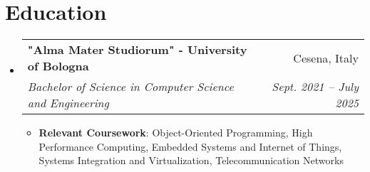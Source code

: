 \documentclass[letterpaper,11pt]{article}
\makeatletter
\newcommand{\resumeItem}[2]{
  \item\small{
    \textbf{#1}{: #2 \vspace{-2pt}}
  }
}
\newcommand{\resumeSubheading}[4]{
  \vspace{-1pt}\item
    \begin{tabular*}{0.97\textwidth}{l@{\extracolsep{\fill}}r}
      \textbf{#1} & #2 \\
      \textit{\small#3} & \textit{\small #4} \\
    \end{tabular*}\vspace{-5pt}
}
\newcommand{\resumeSubHeadingListStart}{\begin{itemize}[leftmargin=*]}
\newcommand{\resumeSubHeadingListEnd}{\end{itemize}}
\newcommand{\resumeItemListStart}{\begin{itemize}}
\newcommand{\resumeItemListEnd}{\end{itemize}\vspace{-5pt}}
\makeatother
\begin{document}
\begin{comment}    
    \resumeSubheading
      {UBM - Unibo Motorsport Team}{Bologna, Italy}
      {Software developer}{Oct. 2023 - Current}
      \resumeItemListStart
        \resumeItem{Python}
          {I improved the back-end of the application, implementing new features, 
            documenting the code and fixing bugs.
            In particular:}
            \resumeItemListStart
                \resumeItem{Connection pooling}
                    {I implemented a connection pool to the database, to avoid the overhead of creating a new connection every time a request is made.}
            \resumeItemListEnd
      \resumeItemListEnd

  
    \resumeSubheading
      {Other Company}{Location}
      {Position}{From - To}
      \resumeItemListStart
        \resumeItem{Technology you worked with/on}
          {Description}
        \resumeItem{Other technology you worked with/on}
          {Description}
      \resumeItemListEnd

    \resumeSubheading
      {Research Position}{Location}
      {Position}{From - To}
      \resumeItemListStart
        \resumeItem{Technology you worked with/on}
          {Description}
        \resumeItem{Other technology you worked with/on}
          {Description}
      \resumeItemListEnd
\end{comment}

\section{Education}
  \resumeSubHeadingListStart
    \resumeSubheading
      {"Alma Mater Studiorum" - University of Bologna}{Cesena, Italy}
      {Bachelor of Science in Computer Science and Engineering}{Sept. 2021 -- July 2025}
      \resumeItemListStart
          \resumeItem{Relevant Coursework}{Object-Oriented Programming, High Performance Computing, 
          Embedded Systems and Internet of Things, Systems Integration and Virtualization, Telecommunication Networks}
      \resumeItemListEnd
  \resumeSubHeadingListEnd

\begin{comment}
\section{Languages}
    \resumeSubHeadingListStart
    \resumeItem
      {Italian}{Native speaker}
    \resumeItem
      {English}{Level C1}
  \resumeSubHeadingListEnd
\end{comment}
\end{document}

